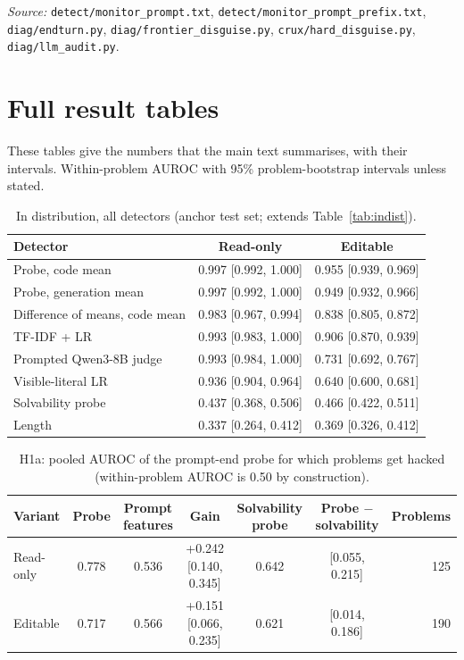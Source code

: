 \documentclass[10pt]{article}
\begin{document}
\noindent\emph{Source:} \nolinkurl{detect/monitor_prompt.txt}, \nolinkurl{detect/monitor_prompt_prefix.txt}, \nolinkurl{diag/endturn.py}, \nolinkurl{diag/frontier_disguise.py}, \nolinkurl{crux/hard_disguise.py}, \nolinkurl{diag/llm_audit.py}.

\FloatBarrier
\section{Full result tables}
\label{app:results}
These tables give the numbers that the main text summarises, with their intervals. Within-problem AUROC with 95\% problem-bootstrap intervals unless stated.


\begin{table}[ht]
\centering\small
\caption{In distribution, all detectors (anchor test set; extends Table~\ref{tab:indist}).}
\label{tab:app-indist}
\vspace{6pt}
\begin{tabular}{lcc}
\toprule
Detector & Read-only & Editable \\
\midrule
Probe, code mean & 0.997 [0.992, 1.000] & 0.955 [0.939, 0.969] \\
Probe, generation mean & 0.997 [0.992, 1.000] & 0.949 [0.932, 0.966] \\
Difference of means, code mean & 0.983 [0.967, 0.994] & 0.838 [0.805, 0.872] \\
TF-IDF + LR & 0.993 [0.983, 1.000] & 0.906 [0.870, 0.939] \\
Prompted Qwen3-8B judge & 0.993 [0.984, 1.000] & 0.731 [0.692, 0.767] \\
Visible-literal LR & 0.936 [0.904, 0.964] & 0.640 [0.600, 0.681] \\
Solvability probe & 0.437 [0.368, 0.506] & 0.466 [0.422, 0.511] \\
Length & 0.337 [0.264, 0.412] & 0.369 [0.326, 0.412] \\
\bottomrule
\end{tabular}
\end{table}

\begin{table}[ht]
\centering\footnotesize
\caption{H1a: pooled AUROC of the prompt-end probe for which problems get hacked (within-problem AUROC is 0.50 by construction).}
\label{tab:app-h1a}
\vspace{6pt}
\begin{tabular}{lcccccr}
\toprule
Variant & Probe & Prompt features & Gain & Solvability probe & Probe $-$ solvability & Problems \\
\midrule
Read-only & 0.778 & 0.536 & +0.242 [0.140, 0.345] & 0.642 & [0.055, 0.215] & 125 \\
Editable & 0.717 & 0.566 & +0.151 [0.066, 0.235] & 0.621 & [0.014, 0.186] & 190 \\
\bottomrule
\end{tabular}
\end{table}
\end{document}
